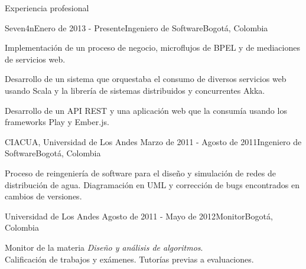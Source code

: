 \documentclass{resume} %
\def\uniandes{Universidad de Los Andes }
\begin{document}
\begin{rSection}{Experiencia profesional}

\begin{rSubsection}{Seven4n}{Enero de 2013 - Presente}{Ingeniero de Software}{Bogot\'a, Colombia}
\item Implementaci\'on de un proceso de negocio, microflujos de BPEL y de mediaciones de servicios web.
\item Desarrollo de un sistema que orquestaba el consumo de diversos servicios web usando Scala y la librer\'ia de sistemas distribuidos y concurrentes Akka.
\item Desarrollo de un API REST y una aplicaci\'on web que la consum\'ia usando los frameworks Play y Ember.js. 
\end{rSubsection}


\begin{rSubsection}{CIACUA, \uniandes}{Marzo de 2011 - Agosto de 2011}{Ingeniero de Software}{Bogot\'a, Colombia}
\item Proceso de reingenier\'ia de software para el dise\~{n}o y simulaci\'on de redes de distribuci\'on de agua. Diagramaci\'on en UML y correcci\'on de bugs encontrados en cambios de versiones.
\end{rSubsection}


\begin{rSubsection}{\uniandes}{Agosto de 2011 - Mayo de 2012}{Monitor}{Bogot\'a, Colombia}
\item Monitor de la materia \textit{Dise\~{n}o y an\'alisis de algoritmos}.\\
Calificaci\'on de trabajos y ex\'amenes. Tutor\'ias previas a evaluaciones.
\end{rSubsection}

\end{rSection}
\end{document}
